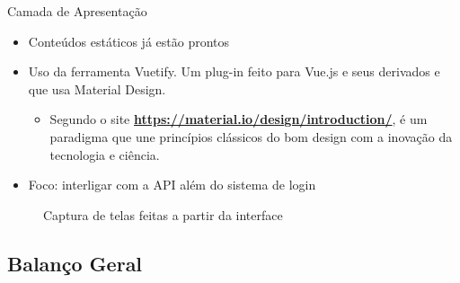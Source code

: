 \documentclass[aspectratio=43,display]{beamer}
\begin{document}
  \begin{frame}{Camada de Apresentação}
    \begin{itemize}
      \item Conteúdos estáticos já estão prontos \pause
      \item Uso da ferramenta Vuetify. Um plug-in feito para Vue.js e seus derivados e que usa Material Design.
      \begin{itemize}
        \item Segundo o site \href{https://material.io/design/introduction/}{\textbf{https://material.io/design/introduction/}},
        é um paradigma que une princípios clássicos do bom design com a inovação da tecnologia e ciência. \pause
      \end{itemize}
      \item Foco: interligar com a API além do sistema de login \pause
    \end{itemize}
    \begin{figure}[htb]
      \centering
      \caption{Captura de telas feitas a partir da interface}
    \end{figure}
  \end{frame}

  \subsection{Balanço Geral}
\end{document}
